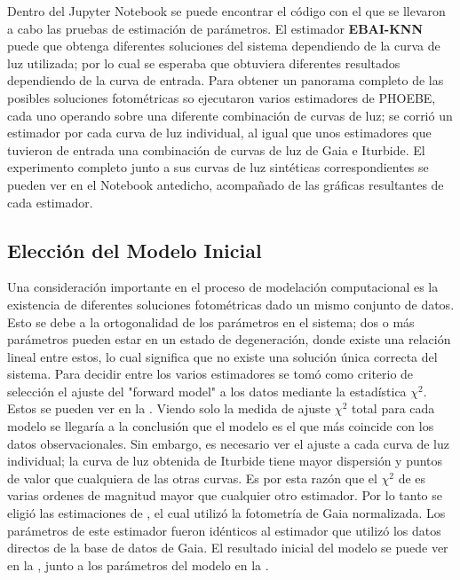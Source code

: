 Dentro del Jupyter Notebook
\href{https://github.com/KnightIV/UANL_MAPTA_PlanObservaciones/blob/main/analisis/phoebe_model/estimations/ebai-default.ipynb}{}
se puede encontrar el código con el que se llevaron a cabo las pruebas de
estimación de parámetros. El estimador \textbf{EBAI-KNN} puede que obtenga
diferentes soluciones del sistema dependiendo de la curva de luz utilizada; por
lo cual se esperaba que obtuviera diferentes resultados dependiendo de la curva
de entrada. Para obtener un panorama completo de las posibles soluciones
fotométricas so ejecutaron varios estimadores de PHOEBE, cada uno operando sobre
una diferente combinación de curvas de luz; se corrió un estimador por cada
curva de luz individual, al igual que unos estimadores que tuvieron de entrada
una combinación de curvas de luz de Gaia e Iturbide. El experimento completo
junto a sus curvas de luz sintéticas correspondientes se pueden ver en el
Notebook antedicho, acompañado de las gráficas resultantes de cada estimador.

\subsection{Elección del Modelo Inicial}
\label{metodologia:modelocomputacional:estimacionesiniciales:eligiendomodeloinicial}

Una consideración importante en el proceso de modelación computacional es la
existencia de diferentes soluciones fotométricas dado un mismo conjunto de
datos. Esto se debe a la ortogonalidad de los parámetros en el sistema; dos o
más parámetros pueden estar en un estado de degeneración, donde existe una
relación lineal entre estos, lo cual significa que no existe una solución única
correcta del sistema. Para decidir entre los varios estimadores se tomó como
criterio de selección el ajuste del "forward model" a los datos mediante la
estadística $\chi^2$. Estos se pueden ver en la .
Viendo solo la medida de ajuste $\chi^2$ total para cada modelo se llegaría a la
conclusión que el modelo  es el
que más coincide con los datos observacionales. Sin embargo, es necesario ver el
ajuste a cada curva de luz individual; la curva de luz obtenida de Iturbide
tiene mayor dispersión y puntos de valor que cualquiera de las otras curvas. Es
por esta razón que el $\chi^2$ de  es varias
ordenes de magnitud mayor que cualquier otro estimador. Por lo tanto se eligió
las estimaciones de , el cual utilizó la
fotometría de Gaia normalizada. Los parámetros de este estimador fueron
idénticos al estimador que utilizó los datos directos de la base de datos de
Gaia. El resultado inicial del modelo se puede ver en la
, junto a los parámetros del modelo en la
.


